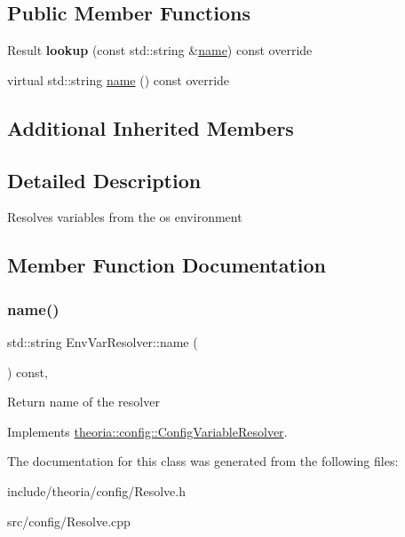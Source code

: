 \subsection*{Public Member Functions}
\begin{DoxyCompactItemize}
\item 
\mbox{\label{classtheoria_1_1config_1_1EnvVarResolver_abe8584760283bca6c2ebda1116c8159b}} 
Result {\bfseries lookup} (const std\+::string \&\hyperlink{classtheoria_1_1config_1_1EnvVarResolver_ab2c250e1b7866dcd618dc90f3c3eab19}{name}) const override
\item 
virtual std\+::string \hyperlink{classtheoria_1_1config_1_1EnvVarResolver_ab2c250e1b7866dcd618dc90f3c3eab19}{name} () const override
\end{DoxyCompactItemize}
\subsection*{Additional Inherited Members}


\subsection{Detailed Description}
Resolves variables from the os environment 

\subsection{Member Function Documentation}
\mbox{\label{classtheoria_1_1config_1_1EnvVarResolver_ab2c250e1b7866dcd618dc90f3c3eab19}} 
\subsubsection{\texorpdfstring{name()}{name()}}
{\footnotesize\ttfamily std\+::string Env\+Var\+Resolver\+::name (\begin{DoxyParamCaption}{ }\end{DoxyParamCaption}) const\hspace{0.3cm}{\ttfamily [override]}, {\ttfamily [virtual]}}

Return name of the resolver 

Implements \hyperlink{classtheoria_1_1config_1_1ConfigVariableResolver_a026bda729faf988eaef334a45ec92303}{theoria\+::config\+::\+Config\+Variable\+Resolver}.



The documentation for this class was generated from the following files\+:\begin{DoxyCompactItemize}
\item 
include/theoria/config/Resolve.\+h\item 
src/config/Resolve.\+cpp\end{DoxyCompactItemize}
